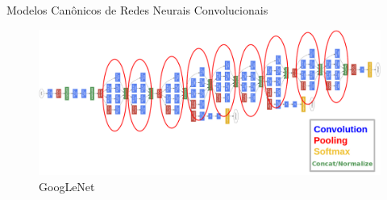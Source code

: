 \begin{frame}{\LARGE{Modelos Canônicos de Redes Neurais Convolucionais}}
     \ \  \\[0.5cm]
     \begin{figure}[h!]
     	\centering
     	\includegraphics[width=0.7\linewidth]{img/inception}
     	\caption{GoogLeNet}
     \end{figure}
\end{frame}

